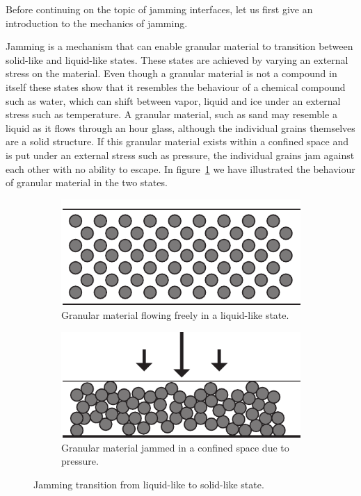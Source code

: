 Before continuing on the topic of jamming interfaces, let us first give an introduction to the mechanics of jamming.

Jamming is a mechanism that can enable granular material to transition between solid-like and liquid-like states. 
These states are achieved by varying an external stress on the material.
Even though a granular material is not a compound in itself these states show that it resembles the behaviour of a chemical compound such as water, which can shift between vapor, liquid and ice under an external stress such as temperature.
A granular material, such as sand may resemble a liquid as it flows through an hour glass, although the individual grains themselves are a solid structure. 
If this granular material exists within a confined space and is put under an external stress such as pressure, the individual grains jam against each other with no ability to escape.
In figure~\ref{fig:ch:jamming:particles:jam_unjam} we have illustrated the behaviour of granular material in the two states.

\begin{figure}[h]
\centering
\begin{subfigure}[b]{.44\textwidth}
  \centering
  \includegraphics[width=\linewidth]{figures/jamming/particles_unjammed.pdf}
  \caption{Granular material flowing freely in a liquid-like state.}
\end{subfigure}%
\hspace{0.02\textwidth}
\begin{subfigure}[b]{.44\textwidth}
  \centering
  \includegraphics[width=\linewidth]{figures/jamming/particles_jammed.pdf}
  \caption{Granular material jammed in a confined space due to pressure.}
\end{subfigure}
\caption{Jamming transition from liquid-like to solid-like state.}
\label{fig:ch:jamming:particles:jam_unjam}
\end{figure}

